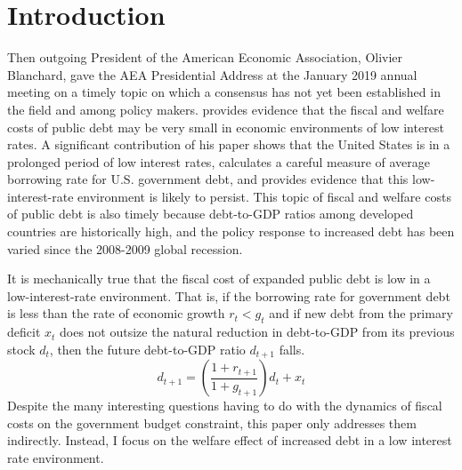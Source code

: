 \documentclass[letterpaper,12pt]{article}
\theoremstyle{definition}
\begin{document}


\section{Introduction}\label{SecIntro}

  Then outgoing President of the American Economic Association, Olivier Blanchard, gave the AEA Presidential Address at the January 2019 annual meeting on a timely topic on which a consensus has not yet been established in the field and among policy makers. \citet{Blanchard:2019} provides evidence that the fiscal and welfare costs of public debt may be very small in economic environments of low interest rates. A significant contribution of his paper shows that the United States is in a prolonged period of low interest rates, calculates a careful measure of average borrowing rate for U.S. government debt, and provides evidence that this low-interest-rate environment is likely to persist. This topic of fiscal and welfare costs of public debt is also timely because debt-to-GDP ratios among developed countries are historically high, and the policy response to increased debt has been varied since the 2008-2009 global recession.

  It is mechanically true that the fiscal cost of expanded public debt is low in a low-interest-rate environment. That is, if the borrowing rate for government debt is less than the rate of economic growth $r_t<g_t$ and if new debt from the primary deficit $x_t$ does not outsize the natural reduction in debt-to-GDP from its previous stock $d_t$, then the future debt-to-GDP ratio $d_{t+1}$ falls.
  \begin{equation*}
    d_{t+1} = \left(\frac{1+r_{t+1}}{1+g_{t+1}}\right)d_t + x_t
  \end{equation*}
  Despite the many interesting questions having to do with the dynamics of fiscal costs on the government budget constraint, this paper only addresses them indirectly. Instead, I focus on the welfare effect of increased debt in a low interest rate environment.
\end{document}
